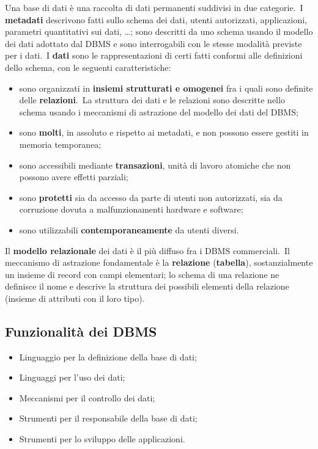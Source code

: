Una base di dati è una raccolta di dati permanenti suddivisi in due categorie.\
I \textbf{metadati} descrivono fatti sullo schema dei dati, utenti autorizzati, applicazioni, parametri quantitativi sui dati, \dots; sono descritti da uno
schema usando il modello dei dati adottato dal DBMS e sono interrogabili con le stesse modalità previste per i dati.\
I \textbf{dati} sono le rappresentazioni di certi fatti conformi alle definizioni dello schema, con le seguenti caratteristiche:
\begin{itemize}
	\item sono organizzati in \textbf{insiemi strutturati e omogenei} fra i quali sono definite delle \textbf{relazioni}.\ La struttura dei dati e le relazioni sono descritte nello schema usando i meccanismi di astrazione del modello dei dati del DBMS;
	\item sono \textbf{molti}, in assoluto e rispetto ai metadati, e non possono essere gestiti in memoria temporanea;
	\item sono accessibili mediante \textbf{transazioni}, unità di lavoro atomiche che non possono avere effetti parziali;
	\item sono \textbf{protetti} sia da accesso da parte di utenti non autorizzati, sia da corruzione dovuta a malfunzionamenti hardware e software;
	\item sono utilizzabili \textbf{contemporaneamente} da utenti diversi.
\end{itemize}
Il \textbf{modello relazionale} dei dati è il più diffuso fra i DBMS commerciali.\
Il meccanismo di astrazione fondamentale è la \textbf{relazione} (\textbf{tabella}), sostanzialmente un insieme di record con campi elementari; lo schema di una relazione ne definisce il nome e descrive la struttura dei possibili elementi della relazione (insieme di attributi con il loro tipo).

\subsection{Funzionalità dei DBMS}

\begin{itemize}
	\item Linguaggio per la definizione della base di dati;
	\item Linguaggi per l'uso dei dati;
	\item Meccanismi per il controllo dei dati;
	\item Strumenti per il responsabile della base di dati;
	\item Strumenti per lo sviluppo delle applicazioni.
\end{itemize}

